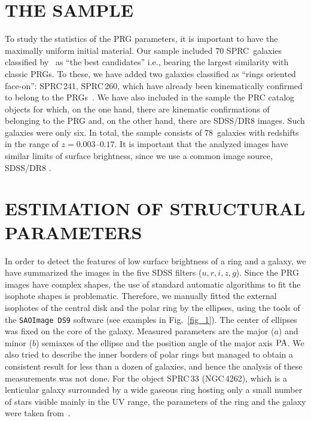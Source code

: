 \documentclass{ab}
\begin{document}
\section{THE SAMPLE}


To study the statistics of the PRG parameters, it is important to
have the maximally uniform initial material. Our sample included
70 SPRC~galaxies classified by~\citet{Moiseev_SDSS} as
``the best candidates'' i.e., bearing the largest similarity
with classic PRGs. To these, we have added two galaxies classified
as ``rings oriented \mbox{face-on}'': SPRC\,241, SPRC\,260, which
have already been kinematically confirmed to belong to the
PRGs~\citep{Khoperskov12}. We have also included in the
sample the PRC catalog objects for which, on the one hand, there
are kinematic confirmations of belonging to the PRG  and, on
the other hand, there are SDSS/DR8 images. Such galaxies were only
six. In total, the sample consists of 78~galaxies with redshifts
in the range of    \mbox{$z= 0.003$--$0.17$}. It is important that
the analyzed images have similar limits of surface brightness,
since we use a common image source, SDSS/DR8 .



\section{ESTIMATION OF STRUCTURAL PARAMETERS}

In order to detect the features of low surface brightness of a
ring and a galaxy, we have summarized the images in the five SDSS
filters ($u,r,i,z,g$). Since the PRG images have complex shapes,
the use of standard automatic algorithms to fit the isophote
shapes is problematic. Therefore, we manually fitted the external
isophotes of the central disk and the polar ring by the ellipses,
using the tools of the {\tt SAOImage~DS9} software (see examples
in Fig.~\ref{fig_1}). The center of ellipses was fixed
on the core of the galaxy. Measured parameters are the major ($a$)
and minor ($b$) semiaxes of the ellipse and the position angle of
the major axis $\rm PA$. We also tried to describe the inner
borders of polar rings but managed to obtain a consistent result
for less than a dozen of galaxies, and hence the analysis of these
measurements was not done.  For the object SPRC\,33 (NGC\,4262),
which is a lenticular galaxy surrounded by a wide gaseous ring
hosting only a small number of stars visible mainly in the UV
range, the parameters of the ring and the galaxy were taken
from~\citet{Khoperskov2013}.
\end{document}

